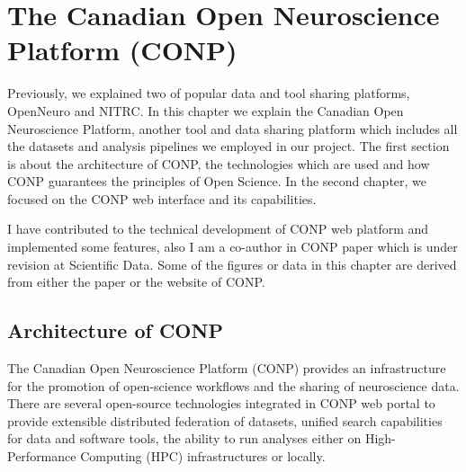 \chapter{The Canadian Open Neuroscience Platform (CONP)}


\label{CONP}

Previously, we explained two of popular data and tool sharing platforms, OpenNeuro and NITRC. In this chapter we explain the Canadian Open Neuroscience Platform, another tool and data sharing platform which includes all the datasets and analysis pipelines we employed in our project. The first section is about the architecture of CONP, the technologies which are used and how CONP guarantees the principles of Open Science. In the second chapter, we focused on the CONP web interface and its capabilities. 

I have contributed to the technical development of CONP web platform and implemented some features, also I am a co-author in CONP paper which is under revision at Scientific Data. Some of the figures or data in this chapter are derived from either the paper or the website of CONP.

\section{Architecture of CONP}
The Canadian Open Neuroscience Platform (CONP) provides an infrastructure for the promotion of open-science workflows and the sharing of neuroscience data. There are several open-source technologies integrated in CONP web portal to provide extensible distributed federation of datasets, unified search capabilities for data and software tools, the ability to run analyses either on High-Performance Computing (HPC) infrastructures or locally.


